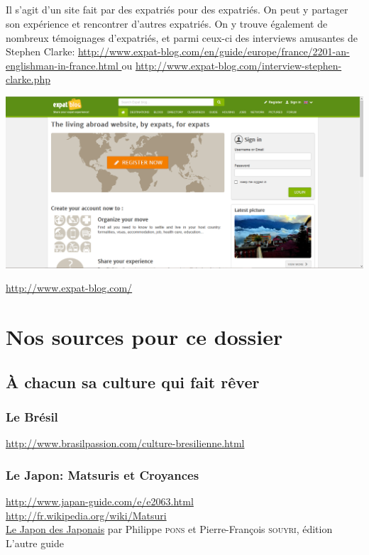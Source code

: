 \paragraph{}
Il s'agit d'un site fait par des expatriés pour des expatriés. On peut y partager son expérience et rencontrer d'autres expatriés. On y trouve également de nombreux témoignages d'expatriés, et parmi ceux-ci des interviews amusantes de Stephen Clarke: \url{http://www.expat-blog.com/en/guide/europe/france/2201-an-englishman-in-france.html } ou \url{http://www.expat-blog.com/interview-stephen-clarke.php} 
\begin{center}
	\includegraphics[scale=0.25]{expatblog.png}
\end{center}
\url{http://www.expat-blog.com/}

\chapter[Sources]{Nos sources pour ce dossier}

\section{À chacun sa culture qui fait rêver}

\subsection{Le Brésil}
\noindent
\url{http://www.brasilpassion.com/culture-bresilienne.html}

\subsection{Le Japon: Matsuris et Croyances}
\noindent
\url{http://www.japan-guide.com/e/e2063.html}\\
\url{http://fr.wikipedia.org/wiki/Matsuri}\\
\underline{Le Japon des Japonais} par Philippe \textsc{pons} et Pierre-François \textsc{souyri}, édition L'autre guide

